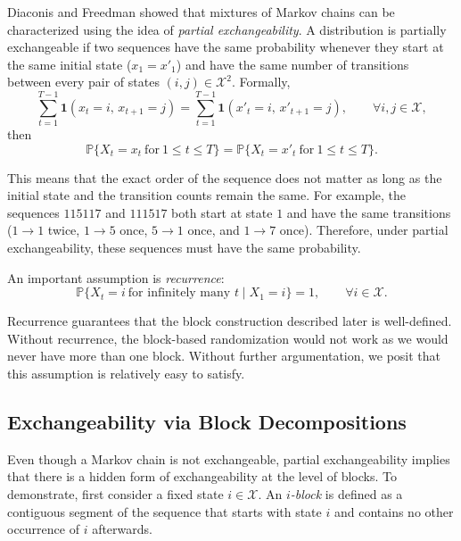 \documentclass{article}
\begin{document}
Diaconis and Freedman showed that mixtures of Markov chains can be characterized using the idea of \emph{partial exchangeability}. A distribution is partially exchangeable if two sequences have the same probability whenever they start at the same initial state ($x_1=x'_1$) and have the same number of transitions between every pair of states $(i,j)\in\mathcal{X}^2$. Formally,
\begin{equation}
\sum_{t=1}^{T-1}\mathbf{1}(x_t=i,\,x_{t+1}=j)
=
\sum_{t=1}^{T-1}\mathbf{1}(x'_t=i,\,x'_{t+1}=j),
\qquad \forall i,j\in\mathcal{X},
\label{eq:trans_counts}
\end{equation}
then
\begin{equation}
\mathbb{P}\{X_t=x_t \ \text{for}\ 1\le t\le T\}
=
\mathbb{P}\{X_t=x'_t \ \text{for}\ 1\le t\le T\}.
\label{eq:partial_exch}
\end{equation}

This means that the exact order of the sequence does not matter as long as the initial state and the transition counts remain the same. For example, the sequences $115117$ and $111517$ both start at state $1$ and have the same transitions ($1\to1$ twice, $1\to5$ once, $5\to1$ once, and $1\to7$ once). Therefore, under partial exchangeability, these sequences must have the same probability.

An important assumption is \emph{recurrence}:
\begin{equation}
\mathbb{P}\{X_t=i \ \text{for infinitely many } t \mid X_1=i\}=1,\qquad \forall i\in\mathcal{X}.
\label{eq:recurrence}
\end{equation}

Recurrence guarantees that the block construction described later is well-defined. Without recurrence, the block-based randomization would not work as we would never have more than one block. Without further argumentation, we posit that this assumption is relatively easy to satisfy.

\subsection{Exchangeability via Block Decompositions}

Even though a Markov chain is not exchangeable, partial exchangeability implies that there is a hidden form of exchangeability at the level of blocks. To demonstrate, first consider a fixed state $i\in\mathcal{X}$. An \emph{$i$-block} is defined as a contiguous segment of the sequence that starts with state $i$ and contains no other occurrence of $i$ afterwards. 
\end{document}

